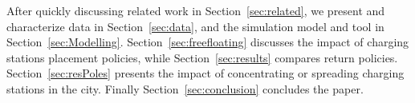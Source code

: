After quickly discussing related work in Section~\ref{sec:related}, we present and characterize data in Section~\ref{sec:data}, and the simulation model and tool in Section~\ref{sec:Modelling}. Section~\ref{sec:freefloating} discusses the impact of charging stations placement policies, while Section~\ref{sec:results} compares return policies. Section~\ref{sec:resPoles} presents the impact of concentrating or spreading charging stations in the city. Finally Section~\ref{sec:conclusion} concludes the paper.

